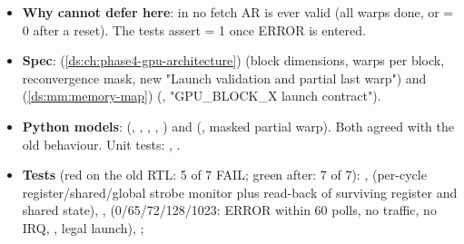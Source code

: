 \begin{record}
\begin{itemize}
  \texttt{last\_\allowbreak{}warp\_\allowbreak{}mask[l]\ =\allowbreak{}\ (BLOCK\_\allowbreak{}X[2:\allowbreak{}0]\ =\allowbreak{}=\allowbreak{}\ 0)\ ||\ (l\ <\ BLOCK\_\allowbreak{}X[2:\allowbreak{}0])}
  feeds the new ; the scheduler loads
  it for warp
  \texttt{n\_\allowbreak{}warps\_\allowbreak{}active\_\allowbreak{}i\ -\allowbreak{}\ 1}
  and  for the others. Every lane already honours
   for register, shared-memory and AXI writes and for
  the divergence masks, so masking at launch is sufficient. No
  runtime-indexed mux: all compares are constant-position against a
  signal. The  struct-member selects (Synlig
  defect class, \cref{cr:defect:synlig-struct-select-ainf}) were replaced
  by a plain wire;  passes and the
  stale baseline line was removed.
\item
  \textbf{Why  cannot defer  here}: in
   no fetch AR is ever valid (all warps done, or
   = 0 after a reset). The tests assert  =
  1 once ERROR is entered.
\item
  \textbf{Spec}:  (\cref{ds:ch:phase4-gpu-architecture}) (block
  dimensions, warps per block, reconvergence mask, new "Launch
  validation and partial last warp") and  (\cref{ds:mm:memory-map})
  (, "GPU\_\allowbreak{}BLOCK\_\allowbreak{}X
  launch contract").
\item
  \textbf{Python models}: 
  (, , ,
  , ) and
   (, masked
  partial warp). Both agreed with the old behaviour. Unit tests:
  ,
  .
\item
  \textbf{Tests} (red on the old RTL: 5 of 7 FAIL; green after: 7 of 7):
   ,
   (per-cycle
  register/\allowbreak{}shared/\allowbreak{}global strobe monitor plus
  read-back of surviving register and shared state),
  ,
  (0/\allowbreak{}65/\allowbreak{}72/\allowbreak{}128/\allowbreak{}1023:
  ERROR within 60 polls, no traffic, no IRQ, , legal
  launch), ;

\end{itemize}
\end{record}

